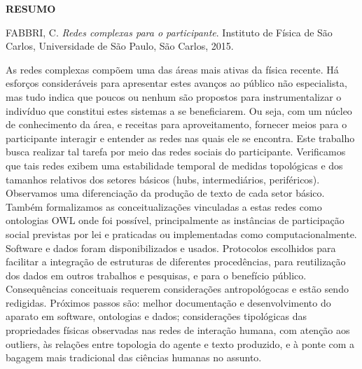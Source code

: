 \documentclass[a4paper,openright,12pt]{report} %
\begin{document}
\begin{singlespace}

\centerline{\LARGE{{\bf RESUMO}}}

\vspace*{1.5cm}

\hspace*{-0.9cm} FABBRI, C. \textit{Redes complexas para o participante}. 
Instituto de Física de São Carlos, Universidade de São Paulo, São Carlos, 2015. 

\vspace*{1.2cm}

\hspace*{-0.9cm}

{\noindent
    As redes complexas compõem uma das áreas mais ativas da física recente.
    Há esforços consideráveis para apresentar estes avanços ao público não especialista, mas tudo indica
    que poucos ou nenhum são propostos para instrumentalizar o indivíduo que constitui estes sistemas a se beneficiarem.
    Ou seja, com um núcleo de conhecimento da área, e receitas para aproveitamento,
    fornecer meios para o participante interagir e entender as redes nas quais ele se encontra.
    Este trabalho busca realizar tal tarefa por meio das redes sociais do participante.
    Verificamos que tais redes exibem uma estabilidade temporal de medidas topológicas e dos
    tamanhos relativos dos setores básicos (hubs, intermediários, periféricos).
    Observamos uma diferenciação da produção de texto de cada setor básico.
    Também formalizamos as conceitualizações vinculadas a estas redes como ontologias OWL onde foi possível,
    principalmente as instâncias de participação social previstas por lei e praticadas ou implementadas como computacionalmente.
    Software e dados foram disponibilizados e usados. Protocolos escolhidos para
    facilitar a integração de estruturas de diferentes procedências,
    para reutilização dos dados em outros trabalhos e pesquisas, e para o benefício público.
    Consequências conceituais requerem considerações antropológocas e estão sendo redigidas.
    Próximos passos são: melhor documentação e desenvolvimento do aparato em software, ontologias e dados;
    considerações tipológicas das propriedades físicas observadas nas redes de interação humana, com
    atenção aos outliers, às relações entre topologia do agente e texto produzido, e à ponte com
    a bagagem mais tradicional das ciências humanas no assunto.
}


\end{singlespace}
\end{document}
